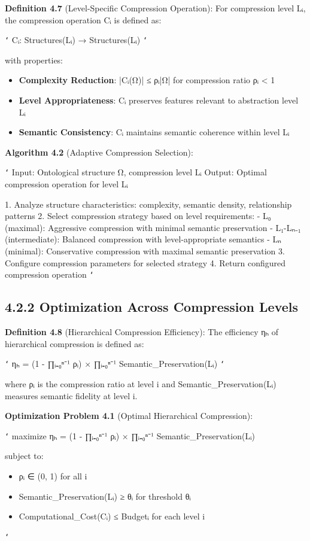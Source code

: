\textbf{Definition 4.7} (Level-Specific Compression Operation): For compression level Lᵢ, the compression operation Cᵢ is defined as:

\texttt{`}
Cᵢ: Structures(Lᵢ) → Structures(Lᵢ)
\texttt{`}

with properties:
\begin{itemize}
\item \textbf{Complexity Reduction}: |Cᵢ(Ω)| ≤ ρᵢ|Ω| for compression ratio ρᵢ < 1
\item \textbf{Level Appropriateness}: Cᵢ preserves features relevant to abstraction level Lᵢ
\item \textbf{Semantic Consistency}: Cᵢ maintains semantic coherence within level Lᵢ
\end{itemize}

\textbf{Algorithm 4.2} (Adaptive Compression Selection):

\texttt{`}
Input: Ontological structure Ω, compression level Lᵢ
Output: Optimal compression operation for level Lᵢ

1. Analyze structure characteristics: complexity, semantic density, relationship patterns
2. Select compression strategy based on level requirements:
   - L₀ (maximal): Aggressive compression with minimal semantic preservation
   - L₁-Lₙ₋₁ (intermediate): Balanced compression with level-appropriate semantics
   - Lₙ (minimal): Conservative compression with maximal semantic preservation
3. Configure compression parameters for selected strategy
4. Return configured compression operation
\texttt{`}

\subsection{4.2.2 Optimization Across Compression Levels}

\textbf{Definition 4.8} (Hierarchical Compression Efficiency): The efficiency ηₕ of hierarchical compression is defined as:

\texttt{`}
ηₕ = (1 - ∏ᵢ₌₀ⁿ⁻¹ ρᵢ) × ∏ᵢ₌₀ⁿ⁻¹ Semantic_Preservation(Lᵢ)
\texttt{`}

where ρᵢ is the compression ratio at level i and Semantic_Preservation(Lᵢ) measures semantic fidelity at level i.

\textbf{Optimization Problem 4.1} (Optimal Hierarchical Compression):

\texttt{`}
maximize ηₕ = (1 - ∏ᵢ₌₀ⁿ⁻¹ ρᵢ) × ∏ᵢ₌₀ⁿ⁻¹ Semantic_Preservation(Lᵢ)

subject to:
\begin{itemize}
\item ρᵢ ∈ (0, 1) for all i
\item Semantic_Preservation(Lᵢ) ≥ θᵢ for threshold θᵢ
\item Computational_Cost(Cᵢ) ≤ Budgetᵢ for each level i
\end{itemize}
\texttt{`}

